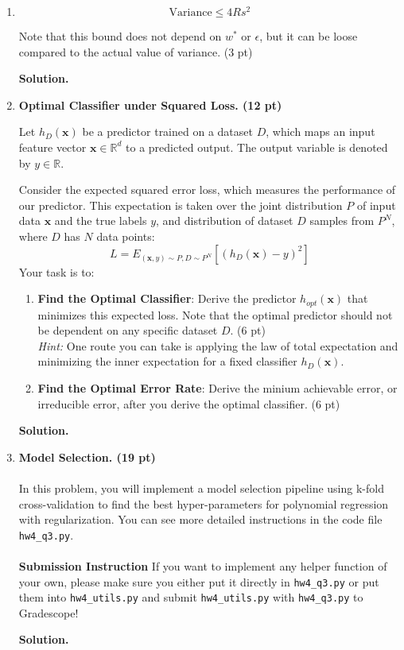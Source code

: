\documentclass{article}
\theoremstyle{definition}
\theoremstyle{remark}
\newenvironment{Q}
    {%
      \clearpage
      \item
    }
    {%
      \phantom{s}
      \bigskip
      \textbf{Solution.}
    }
\begin{document}
\begin{enumerate}[font={\Large\bfseries},left=0pt]
\begin{Q}
\begin{enumerate}
    $$
    \text{Variance} \leq 4Rs^2
    $$

    Note that this bound does not depend on $w^*$ or $\epsilon$, but it can be loose compared to the actual value of variance. (3 pt)
\end{enumerate}

\end{Q}

\begin{Q}
\textbf{\Large Optimal Classifier under Squared Loss. \textbf{(12 pt)}}

Let $h_D(\boldsymbol{x})$ be a predictor trained on a dataset $D$, which maps an input feature vector $\boldsymbol{x}\in \mathbb{R}^d$ to a predicted output. The output variable is denoted by $y\in\mathbb{R}$.

Consider the expected squared error loss, which measures the performance of our predictor. This expectation is taken over the joint distribution $P$ of input data $\boldsymbol{x}$ and the true labels $y$, and distribution of dataset $D$ samples from $P^N$, where $D$ has $N$ data points:
$$L = E_{(\boldsymbol{x}, y)\sim P, D\sim P^N}\left[(h_D(\boldsymbol{x}) - y)^2\right]$$
Your task is to:
\begin{enumerate}
    \item \textbf{Find the Optimal Classifier}: Derive the predictor $h_{opt}(\boldsymbol{x})$ that minimizes this expected loss. Note that the optimal predictor should not be dependent on any specific dataset $D$. (6 pt) \\ 
    \textit{Hint:} One route you can take is applying the law of total expectation and minimizing the inner expectation for a fixed classifier $h_D(\boldsymbol{x})$.
    \item \textbf{Find the Optimal Error Rate}: Derive the minium achievable error, or irreducible error, after you derive the optimal classifier. (6 pt)
\end{enumerate}
\end{Q}

\begin{Q}
\textbf{\Large Model Selection. \textbf{(19 pt)}} 
\\ \\ In this problem, you will implement a  model selection pipeline using k-fold cross-validation to find the best hyper-parameters for polynomial regression with regularization. You can see more detailed instructions in the code file \texttt{hw4\_q3.py}. \\ \\
\textbf{Submission Instruction} If you want to implement any helper function of your own, please make sure you either put it directly in \texttt{hw4\_q3.py} or put them into \texttt{hw4\_utils.py} and submit \texttt{hw4\_utils.py} with \texttt{hw4\_q3.py} to Gradescope!


\end{Q}
\end{enumerate}
\end{document}
